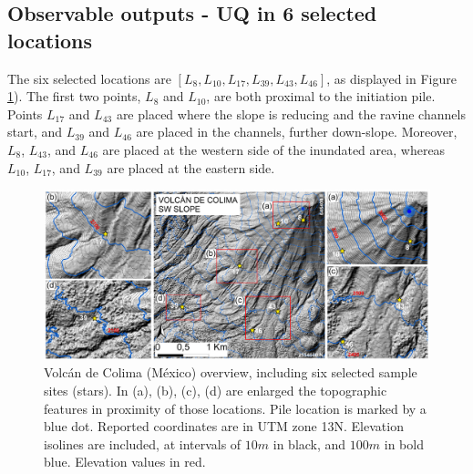 \documentclass{article}
\begin{document}
\subsection{Observable outputs - UQ in 6 selected locations}\label{Obs2}
The six selected locations are $[L_8, L_{10}, L_{17}, L_{39}, L_{43}, L_{46}]$, as displayed in Figure \ref{fig:Colima-extra}). The first two points, $L_8$ and $L_{10}$, are both proximal to the initiation pile. Points $L_{17}$ and $L_{43}$ are placed where the slope is reducing and the ravine channels start, and $L_{39}$ and $L_{46}$ are placed in the channels, further down-slope. Moreover, $L_8$, $L_{43}$, and $L_{46}$ are placed at the western side of the inundated area, whereas $L_{10}$, $L_{17}$, and $L_{39}$ are placed at the eastern side.
\begin{figure}[H]
         \centering
        \includegraphics[width=1\textwidth]{BAF_VolcanDeColima/FigExtra.jpg}
        \caption{Volc{\'a}n de Colima (M{\'e}xico) overview, including six selected sample sites (stars). In (a), (b), (c), (d) are enlarged the topographic features in proximity of those locations. Pile location is marked by a blue dot. Reported coordinates are in UTM zone 13N. Elevation isolines are included, at intervals of $10 m$ in black, and $100m$ in bold blue. Elevation values in red.}
        \label{fig:Colima-extra}
\end{figure} 
\end{document}
